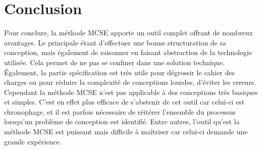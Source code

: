 \section{Conclusion}



Pour conclure, la méthode MCSE apporte un outil complet offrant de nombreux avantages. 
Le principale étant d’effectuer une bonne structuration de sa conception, mais également de raisonner en faisant
abstraction de la technologie utilisée. 
Cela permet de ne pas se confiner dans une solution technique. 
Également, la partie spécification est très utile pour dégrossir le cahier des charges ou pour réduire la complexité de conceptions lourdes, d’éviter les erreurs. 
Cependant la méthode MCSE n’est pas applicable à des conceptions très basiques et simples. 
C’est en effet plus efficace de s’abstenir de cet outil car celui-ci est chronophage, et il est parfois nécessaire de réitérer l’ensemble du processus lorsqu’un problème de conception est identifié. 
Entre autres, l’outil qu’est la méthode MCSE est puissant mais difficile à maîtriser car celui-ci demande une grande expérience.
